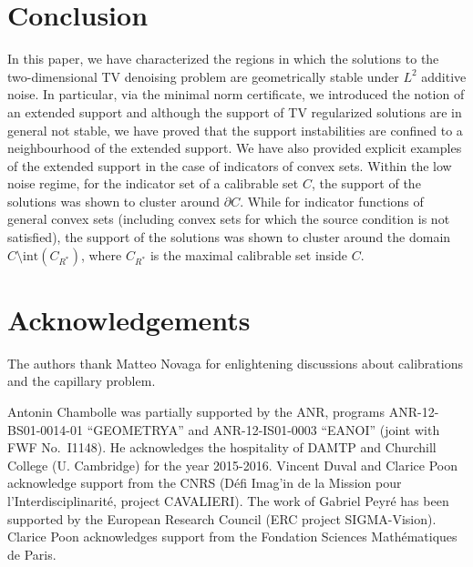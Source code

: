 


\section*{Conclusion}
\label{sec-conclusion}

In this paper, we have characterized the regions in which the solutions to the two-dimensional TV denoising problem are  geometrically stable under $L^2$ additive noise. In particular, via the minimal norm certificate, we introduced the notion of an extended support and although the support of TV regularized solutions are in general not stable, we have proved that the support instabilities are confined to a neighbourhood of the extended support. We have also provided explicit examples of the extended support in the case of indicators of convex sets. Within the low noise regime, for the indicator set of a calibrable set $C$, the support of the solutions was shown to cluster around $\partial C$. While for indicator functions of general convex sets (including convex sets for which the source condition is not satisfied), the support of the  solutions was shown to cluster around the domain $C\setminus \mathrm{int}(C_{R^*})$, where $C_{R^*}$ is the maximal calibrable set inside $C$.

\section*{Acknowledgements}
The authors thank Matteo Novaga for enlightening discussions about calibrations and the capillary problem.

Antonin Chambolle was partially supported by the ANR, programs ANR-12-BS01-0014-01 ``GEOMETRYA'' and ANR-12-IS01-0003 ``EANOI'' (joint with FWF No.~I1148). He acknowledges the hospitality of DAMTP and Churchill College (U. Cambridge) for the year 2015-2016.
%
Vincent Duval and Clarice Poon acknowledge support from the CNRS (D\'efi Imag'in de la Mission pour l'Interdisciplinarit\'e, project CAVALIERI).
%
The work of Gabriel Peyr\'e has been supported by the European Research Council (ERC project SIGMA-Vision).
%
Clarice Poon acknowledges support from the Fondation Sciences Math\'{e}matiques de Paris. 
